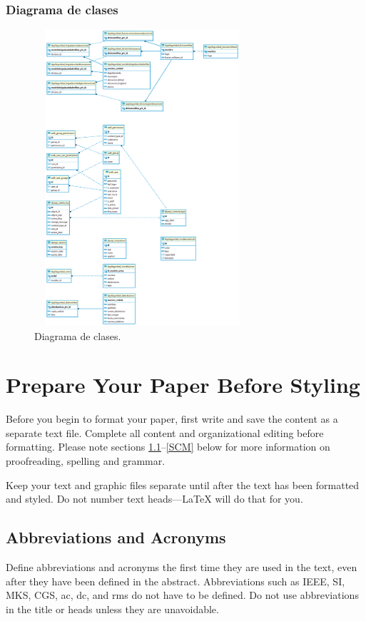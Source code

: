 \documentclass[conference]{IEEEtran}
\begin{document}
\subsubsection{Diagrama de clases}
\begin{figure}[htbp]
	\centerline{\includegraphics [width=8cm, height=11cm] {cerberus.sqlite3.png}}
	\caption{Diagrama de clases.}
\end{figure}


\section{Prepare Your Paper Before Styling}
Before you begin to format your paper, first write and save the content as a 
separate text file. Complete all content and organizational editing before 
formatting. Please note sections \ref{AA}--\ref{SCM} below for more information on 
proofreading, spelling and grammar.

Keep your text and graphic files separate until after the text has been 
formatted and styled. Do not number text heads---{\LaTeX} will do that 
for you.

\subsection{Abbreviations and Acronyms}\label{AA}
Define abbreviations and acronyms the first time they are used in the text, 
even after they have been defined in the abstract. Abbreviations such as 
IEEE, SI, MKS, CGS, ac, dc, and rms do not have to be defined. Do not use 
abbreviations in the title or heads unless they are unavoidable.
\end{document}

